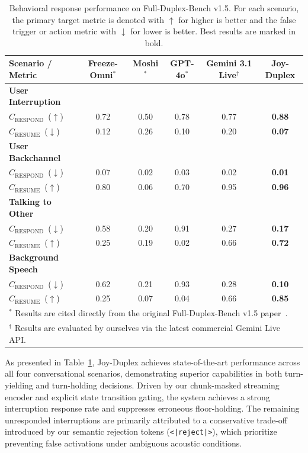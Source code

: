 \begin{table}[ht]
\centering
\caption{Behavioral response performance on Full-Duplex-Bench v1.5. For each scenario, the primary target metric is denoted with $\uparrow$ for higher is better and the false trigger or action metric with $\downarrow$ for lower is better. Best results are marked in bold.}
\label{tab:fd_bench_eval_comprehensive}
\begin{tabular}{lccccc}
\toprule
\textbf{Scenario / Metric} & \textbf{Freeze-Omni$^*$} & \textbf{Moshi$^*$} & \textbf{GPT-4o$^*$} & \textbf{Gemini 3.1 Live$^\dagger$} & \textbf{Joy-Duplex} \\
\midrule
\rowcolor[gray]{0.92} \textbf{User Interruption} & & & & & \\
\quad $C_{\text{RESPOND}}$~($\uparrow$) & 0.72 & 0.50 & 0.78 & 0.77 & \textbf{0.88} \\
\quad $C_{\text{RESUME}}$~($\downarrow$)  & 0.12 & 0.26 & 0.10 & 0.20 & \textbf{0.07} \\
\hline
\rowcolor[gray]{0.92} \textbf{User Backchannel} & & & & & \\
\quad $C_{\text{RESPOND}}$~($\downarrow$) & 0.07 & 0.02 & 0.03 & 0.02 & \textbf{0.01} \\
\quad $C_{\text{RESUME}}$~($\uparrow$)  & 0.80 & 0.06 & 0.70 & 0.95 & \textbf{0.96} \\
\hline
\rowcolor[gray]{0.92} \textbf{Talking to Other} & & & & & \\
\quad $C_{\text{RESPOND}}$~($\downarrow$) & 0.58 & 0.20 & 0.91 & 0.27 & \textbf{0.17} \\
\quad $C_{\text{RESUME}}$~($\uparrow$)  & 0.25 & 0.19 & 0.02 & 0.66 & \textbf{0.72} \\
\hline
\rowcolor[gray]{0.92} \textbf{Background Speech} & & & & & \\
\quad $C_{\text{RESPOND}}$~($\downarrow$) & 0.62 & 0.21 & 0.93 & 0.28 & \textbf{0.10} \\
\quad $C_{\text{RESUME}}$~($\uparrow$)  & 0.25 & 0.07 & 0.04 & 0.66 & \textbf{0.85} \\
\bottomrule
\multicolumn{6}{l}{\small $^*$ Results are cited directly from the original Full-Duplex-Bench v1.5 paper~\cite{lin2026fullduplexv1.5}.} \\
\multicolumn{6}{l}{\small $^\dagger$ Results are evaluated by ourselves via the latest commercial Gemini Live API.}
\end{tabular}
\end{table}

As presented in Table~\ref{tab:fd_bench_eval_comprehensive}, Joy-Duplex achieves state-of-the-art performance across all four conversational scenarios, demonstrating superior capabilities in both turn-yielding and turn-holding decisions. Driven by our chunk-masked streaming encoder and explicit state transition gating, the system achieves a strong interruption response rate and suppresses erroneous floor-holding. The remaining unresponded interruptions are primarily attributed to a conservative trade-off introduced by our semantic rejection tokens (\texttt{<|reject|>}), which prioritize preventing false activations under ambiguous acoustic conditions.


